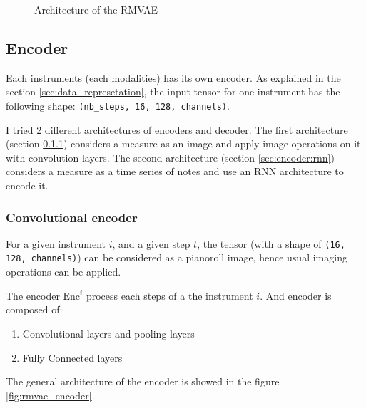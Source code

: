\documentclass[12pt]{report}
\begin{document}
\begin{figure}
\begin{center}
\caption{Architecture of the RMVAE}
\label{fig:rmvae_architecture}
\end{center}
\end{figure}

\subsection{Encoder}
\label{sec:encoder}

Each instruments (each modalities) has its own encoder.
As explained in the section \ref{sec:data_represetation}, the input tensor for one instrument has the following shape: \texttt{(nb\_steps, 16, 128, channels)}.

I tried 2 different architectures of encoders and decoder.
The first architecture (section \ref{sec:encoder:cnn}) considers a measure as an image and apply image operations on it with convolution layers.
The second architecture (section \ref{sec:encoder:rnn}) considers a measure as a time series of notes and use an RNN architecture to encode it.

\subsubsection{Convolutional encoder}
\label{sec:encoder:cnn}

For a given instrument $i$, and a given step $t$, the tensor (with a shape of \texttt{(16, 128, channels)}) can be considered as a pianoroll image, hence usual imaging operations can be applied.

The encoder $\text{Enc}^i$ process each steps of a the instrument $i$. And encoder is composed of:
\begin{enumerate}
    \item Convolutional layers and pooling layers
    \item Fully Connected layers
\end{enumerate}
The general architecture of the encoder is showed in the figure \ref{fig:rmvae_encoder}.
\end{document}
